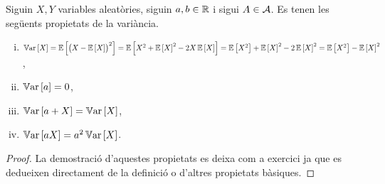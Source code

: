 \begin{prop}
    Siguin $X, Y$ variables aleatòries, siguin $a, b\in\real$ i sigui $A\in\Asuc$. Es tenen les següents propietats de la variància.
    \begin{enumerate}[i)]
        \item $\var\lb X\rb=\esp\lb\lp X-\esp\lb X\rb\rp^2\rb=\esp\lb X^2+\esp\lb X\rb^2-2X\esp\lb X\rb\rb=\esp\lb X^2\rb+\esp\lb X\rb^2-2\esp\lb X\rb^2=\esp\lb X^2\rb-\esp\lb X\rb^2$,
        \item $\var\lb a\rb=0$,
        \item $\var\lb a+X\rb=\var\lb X\rb$,
        \item $\var\lb aX\rb=a^2\var\lb X\rb$.
    \end{enumerate}
\end{prop}
\begin{proof}
 La demostració d'aquestes propietats es deixa com a exercici ja que es dedueixen directament de la definició o d'altres propietats bàsiques.
\end{proof}

